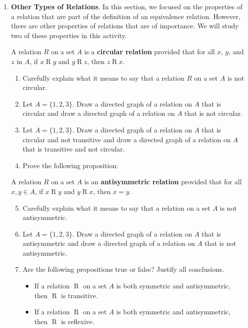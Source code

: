 \begin{enumerate} \setcounter{enumi}{\theoldenumi} 
\item \textbf{Other Types of Relations}.  In this section, we focused on the properties of a relation that are part of the definition of an equivalence relation.  However, there are other properties of relations that are of importance.  We will study two of these properties in this activity.

A relation $R$ on a set $A$ is a \textbf{circular relation}
 provided that for all $x$, $y$, and $z$ in $A$, if $x \mathrel{R} y$ and $y \mathrel{R} z$, then $z \mathrel{R} x$.  
\begin{enumerate}
  \item Carefully explain what it means to say that a relation $R$ on a set $A$ is not circular.
  \item Let $A = \{ 1, 2, 3 \}$.  Draw a directed graph of a relation on $A$ that is circular and draw a directed graph of a relation on $A$ that is not circular.
  \item Let $A = \{ 1, 2, 3 \}$.  Draw a directed graph of a relation on $A$ that is circular and not transitive and draw a directed graph of a relation on $A$ that is transitive and not circular.
  \item Prove the following proposition:
\end{enumerate}


A relation $R$ on a set $A$ is an \textbf{antisymmetric relation}
 provided that for all $x, y \in A$, if $x \mathrel{R} y$ and $y \mathrel{R} x$, then $x = y$.  
\begin{enumerate} \setcounter{enumii}{4} 
  \item Carefully explain what it means to say that a relation on a set $A$ is not antisymmetric.
  \item Let $A = \{ 1, 2, 3 \}$.  Draw a directed graph of a relation on $A$ that is antisymmetric and draw a directed graph of a relation on $A$ that is not antisymmetric.
\item Are the following propositions true or false?  Justify all conclusions.
\begin{itemize}
\item If a relation $\mathrel{R}$ on a set $A$ is both symmetric and antisymmetric, then 
$\mathrel{R}$ is transitive.
\item If a relation $\mathrel{R}$ on a set $A$ is both symmetric and antisymmetric, then 
$\mathrel{R}$ is reflexive.
\end{itemize}
\end{enumerate}

\end{enumerate}


\hbreak


\endinput
